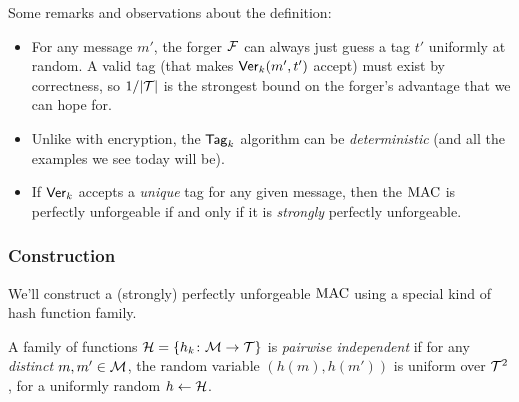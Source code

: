 \documentclass[11pt]{article}
\begin{document}
\noindent Some remarks and observations about the definition:
\begin{itemize}
\item For any message $m'$, the forger $\mathcal{F}$ can always just guess a
  tag $t'$ uniformly at random.  A valid tag (that makes
  $\mathsf{Ver}_{k}(m',t')$ accept) must exist by correctness, so
  $1/\lvert\mathcal{T}\rvert$ is the strongest bound on the forger's advantage
  that we can hope for.
\item Unlike with encryption, the $\mathsf{Tag}_{k}$ algorithm can be
  \emph{deterministic} (and all the examples we see today will be).
\item If $\mathsf{Ver}_{k}$ accepts a \emph{unique} tag for any given
  message, then the $\text{MAC}$ is perfectly unforgeable if and only if it
  is \emph{strongly} perfectly unforgeable.
\end{itemize}

\subsubsection{Construction}
\label{sec:construction-info-mac}

We'll construct a (strongly) perfectly unforgeable $\text{MAC}$ using a
special kind of hash function family.

\begin{definition}
  \label{def:pairwise-ind-hash}
  A family of functions $\mathcal{H} = \{h_{k} \colon \mathcal{M} \to
    \mathcal{T}\}$ is \emph{pairwise independent} if for any
  \emph{distinct} $m,m' \in \mathcal{M}$, the random variable $(h(m),
  h(m'))$ is uniform over $\mathcal{T}^{2}$, for a uniformly random $h
  \gets \mathcal{H}$.
\end{definition}
\end{document}
